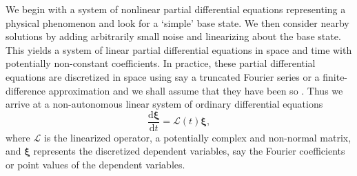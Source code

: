 \documentclass[letterpaper,prl,aps,twocolumn,reprint,superscriptaddress]{revtex4-1}
\newcommand{\cotwo}{CO$_2$ }
\newcommand{\cL}{\boldsymbol{\mathcal{L}}}
\newcommand{\prt}{\boldsymbol{\xi}}
\begin{document}
We begin with a system of nonlinear partial differential equations representing a physical phenomenon and look for a `simple' base state.  We then consider nearby solutions by adding arbitrarily small noise and linearizing about the base state.  This yields a system of linear partial differential equations in space and time with potentially non-constant coefficients.  In practice, these partial differential equations are discretized in space using say a truncated Fourier series or a finite-difference approximation and we shall assume that they have been so \cite{FarrellIoannou}.  Thus we arrive at a non-autonomous linear system of ordinary differential equations
\begin{equation} \label{eq:GE}
\frac{\text{d}\prt}{\text{d} t} = \cL(t)\prt,
\end{equation}
where $\cL$ is the linearized operator, a potentially complex and non-normal matrix, and $\prt$ represents the discretized dependent variables, say the Fourier coefficients or point values of the dependent variables.  


\end{document}
